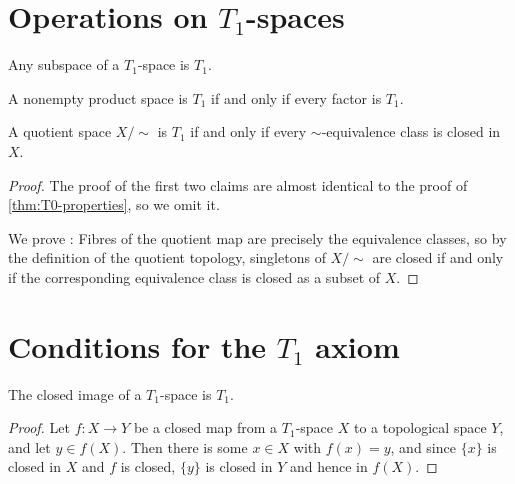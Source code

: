 \documentclass[article, a4paper, 11pt, oneside]{memoir}
\numberwithin{equation}{chapter}
\begin{document}
\section[Operations on T1-spaces][Operations on $T_1$-spaces]{Operations on $T_1$-spaces}

\begin{proposition}
    \label{thm:T1-properties}
    \begin{enumprop}
        \item \label{enum:T1-subspace} Any subspace of a $T_1$-space is $T_1$.
        \item A nonempty product space is $T_1$ if and only if every factor is $T_1$.
        \item \label{enum:T1-quotient} A quotient space $X/{\sim}$ is $T_1$ if and only if every $\sim$-equivalence class is closed in $X$.
    \end{enumprop}
\end{proposition}

\begin{proof}
    The proof of the first two claims are almost identical to the proof of \cref{thm:T0-properties}, so we omit it.

    We prove : Fibres of the quotient map are precisely the equivalence classes, so by the definition of the quotient topology, singletons of $X/{\sim}$ are closed if and only if the corresponding equivalence class is closed as a subset of $X$.
\end{proof}


\section[Conditions for the T1 axiom]{Conditions for the $T_1$ axiom}

\begin{proposition}
    The closed image\footnotemark{} of a $T_1$-space is $T_1$.
\end{proposition}

\begin{proof}
    Let $f \colon X \to Y$ be a closed map from a $T_1$-space $X$ to a topological space $Y$, and let $y \in f(X)$. Then there is some $x \in X$ with $f(x) = y$, and since $\{x\}$ is closed in $X$ and $f$ is closed, $\{y\}$ is closed in $Y$ and hence in $f(X)$.
\end{proof}
\end{document}
